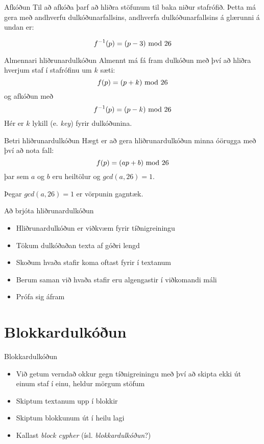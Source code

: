 \documentclass[handout]{beamer}
\begin{document}
\begin{frame}{Afkóðun}
Til að afkóða þarf að hliðra stöfunum til baka niður stafrófið. Þetta má gera með andhverfu dulkóðunarfallsins, andhverfa dulkóðunarfallsins á glærunni á undan er:

\[
 f^{-1}(p) = (p-3)\ \text{mod}\ 26
\]
\end{frame}

\begin{frame}{Almennari hliðrunardulkóðun}
Almennt má fá fram dulkóðun með því að hliðra hverjum staf í stafrófinu um $k$ sæti:
\[
 f(p) = (p + k) \ \text{mod}\ 26
\]
og afkóðun með
\[
 f^{-1}(p) = (p - k) \ \text{mod}\ 26
\]
Hér er $k$ lykill (e. \emph{key}) fyrir dulkóðunina.
\end{frame}

\begin{frame}{Betri hliðrunardulkóðun}
Hægt er að gera hliðrunardulkóðun minna óörugga með því að nota fall:
\[
 f(p) = (ap + b)\ \text{mod}\ 26
\]
þar sem $a$ og $b$ eru heiltölur og $gcd(a,26) = 1$. 

\vspace{0.5cm}

Þegar $gcd(a,26) = 1$ er vörpunin gagntæk.
\end{frame}

\begin{frame}{Að brjóta hliðrunardulkóðun}
\begin{itemize}
 \item Hliðrunardulkóðun er viðkvæm fyrir tíðnigreiningu
 \item Tökum dulkóðaðan texta af góðri lengd
 \item Skoðum hvaða stafir koma oftast fyrir í textanum
 \item Berum saman við hvaða stafir eru algengastir í viðkomandi máli
 \item Prófa sig áfram
\end{itemize}
\end{frame}

\section{Blokkardulkóðun}

\begin{frame}{Blokkardulkóðun}
\begin{itemize}
 \item Við getum verndað okkur gegn tíðnigreiningu með því að skipta ekki út einum staf í einu, heldur mörgum stöfum
 \item Skiptum textanum upp í blokkir
 \item Skiptum blokkunum út í heilu lagi
 \item Kallast \emph{block cypher} (ísl. \emph{blokkardulkóðun}?)
\end{itemize}
\end{frame}
\end{document}
